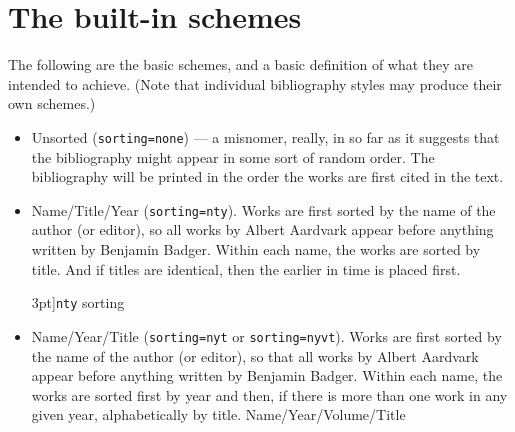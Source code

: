 \section{The built-in schemes}

The following are the basic schemes, and a basic definition of what they
are intended to achieve. (Note that individual bibliography styles may
produce their own schemes.)

\begin{itemize}
\item
  Unsorted (\texttt{sorting=none}) --- a misnomer, really, in so far as
  it suggests that the bibliography might appear in some sort of random
  order. The bibliography will be printed in the order the works are
  first cited in the text.
\item
  Name/Title/Year (\texttt{sorting=nty}). Works are first sorted by the
  name of the author (or editor), so all works by Albert Aardvark appear
  before anything written by Benjamin Badger. Within each name, the
  works are sorted by title. And if titles are identical, then the
  earlier in time is placed first.
  \begin{marginfigure}[-20ex]
  \vspace{0.5pt}
  \caption[][3pt]{\texttt{nty} sorting}
  \end{marginfigure}
\item Name/Year/Title (\texttt{sorting=nyt} or \texttt{sorting=nyvt}).
  Works are first sorted by the name of the author (or editor), so
  that all works by Albert Aardvark appear before anything written by
  Benjamin Badger. Within each name, the works are sorted first by
  year and then, if there is more than one work in any given year,
  alphabetically by title. Name/Year/Volume/Title

\end{itemize}
